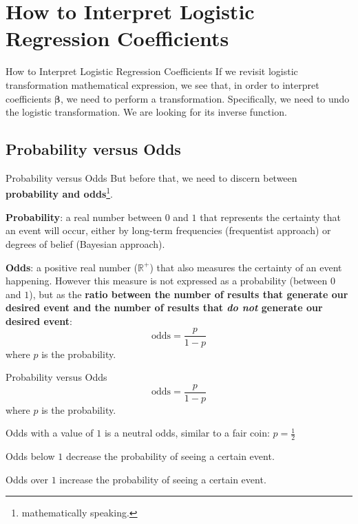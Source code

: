 
\section{How to Interpret Logistic Regression Coefficients}
\begin{frame}[noframenumbering]{How to Interpret Logistic Regression Coefficients}
    If we revisit logistic transformation mathematical expression,
    we see that, in order to interpret coefficients $\boldsymbol{\beta}$,
    we need to perform a transformation.
    \vfill
    Specifically, we need to undo the logistic transformation.
    We are looking for its inverse function.
\end{frame}

\subsection*{Probability versus Odds}
\begin{frame}[noframenumbering]{Probability versus Odds}
    \small
    But before that, we need to discern between
    \textbf{probability and odds}\footnote{mathematically speaking.}.
    \begin{vfilleditems}
        \item \small \textbf{Probability}: a real number between $0$ and $1$
        that represents the certainty that an event will occur,
        either by long-term frequencies (frequentist approach) or
        degrees of belief (Bayesian approach).
        \item \small \textbf{Odds}: a positive real number ($\mathbb{R}^+$)
        that also measures the certainty of an event happening.
        However this measure is not expressed as a probability
        (between $0$ and $1$),
        but as the \textbf{ratio between the number of results that
            generate our desired event and the number of results that
            \textit{do not} generate our desired event}:
        $$
            \text{odds} = \frac{p}{1-p}
        $$
        where $p$ is the probability.
    \end{vfilleditems}
\end{frame}

\begin{frame}[noframenumbering]{Probability versus Odds}
    $$
        \text{odds} = \frac{p}{1-p}
    $$
    where $p$ is the probability.
    \vfill
    \begin{vfilleditems}
        \item Odds with a value of $1$ is a neutral odds,
        similar to a fair coin: $p = \frac{1}{2}$
        \item Odds below $1$ decrease the probability of seeing a certain event.
        \item Odds over $1$ increase the probability of seeing a certain event.
    \end{vfilleditems}
\end{frame}

